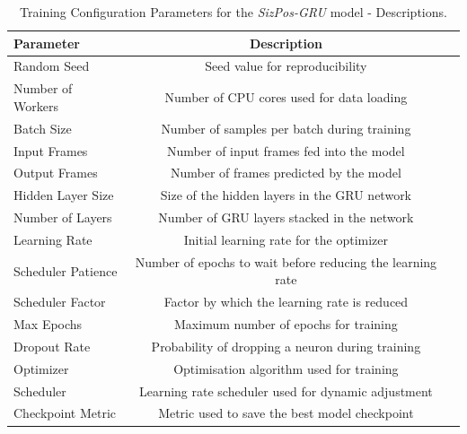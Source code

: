 \documentclass[12pt,oneside]{book} %
\begin{document}
\begin{table}[H]
    \centering
    \caption{Training Configuration Parameters for the \textit{SizPos-GRU} model - Descriptions.}
    \label{tab:training_parameters_description}
    \begin{adjustbox}{max width=\textwidth}
        \begin{tabular}{lcc}
            \toprule
            \textbf{Parameter} & \textbf{Description}                                       \\ 
            \midrule
            Random Seed        & Seed value for reproducibility                             \\
            Number of Workers  & Number of CPU cores used for data loading                  \\
            Batch Size         & Number of samples per batch during training                \\
            Input Frames       & Number of input frames fed into the model                  \\
            Output Frames      & Number of frames predicted by the model                    \\
            Hidden Layer Size  & Size of the hidden layers in the GRU network               \\
            Number of Layers   & Number of GRU layers stacked in the network                \\
            Learning Rate      & Initial learning rate for the optimizer                    \\
            Scheduler Patience & Number of epochs to wait before reducing the learning rate \\
            Scheduler Factor   & Factor by which the learning rate is reduced               \\
            Max Epochs         & Maximum number of epochs for training                      \\
            Dropout Rate       & Probability of dropping a neuron during training           \\
            Optimizer          & Optimisation algorithm used for training                   \\
            Scheduler          & Learning rate scheduler used for dynamic adjustment        \\
            Checkpoint Metric  & Metric used to save the best model checkpoint              \\
            \bottomrule
        \end{tabular}
    \end{adjustbox}
\end{table}
\end{document}
